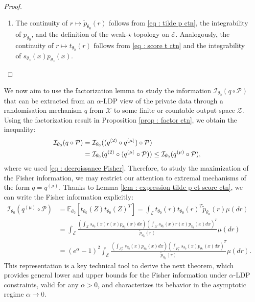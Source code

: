 \documentclass[a4paper, 11pt]{article}
\theoremstyle{definition}
\newcommand{\E}{{\mathbb{E}}}
\newcommand{\cE}{{\mathcal{E}}}
\newcommand{\cI}{{\mathcal{I}}}
\newcommand{\cJ}{{\mathcal{J}}}
\newcommand{\cP}{{\mathcal{P}}}
\newcommand{\cQ}{{\mathcal{Q}}}
\newcommand{\cX}{{\mathcal{X}}}
\newcommand{\cZ}{{\mathcal{Z}}}
\begin{document}
{\begin{proof}
\begin{enumerate}
\[	\]
    Recalling that $r(x)$ is as in \eqref{eq: def r(x)} and that $\int_{\mathcal{X}} s_{\theta_0}(x)p_{\theta_0}(x) dx = 0$ we deduce the second formula.
	\item The continuity of $r \mapsto \widetilde{p}_{\theta_0}(r)$ follows from \eqref{eq : tilde p ctn}, the integrability of $p_{\theta_0}$, and the definition of the weak-$\star$ topology on $\cE$. Analogously, the continuity of $r \mapsto t_{\theta_0}(r)$ follows from \eqref{eq : score t ctn} and the integrability of $s_{\theta_0}(x)p_{\theta_0}(x)$.
\end{enumerate}
\end{proof}
We now aim to use the factorization lemma to study the %
information $\cI_{\theta_0}(q\circ \cP)$ that can be extracted from an $\alpha$-LDP view of the private data through a randomisation mechanism $q$ from $\cX$ to some finite or countable output space $\cZ$.
Using the factorization result in Proposition \ref{prop : factor ctn}, we obtain the inequality:
\begin{align}{\label{eq: fact on Fisher cont}}
	\mathcal{I}_{\theta_0}(q \circ \mathcal{P}) 
	&= \mathcal{I}_{\theta_0}((q^{(2)} \circ q^{(\mu)}) \circ \mathcal{P}) \\
	&= \mathcal{I}_{\theta_0}(q^{(2)} \circ (q^{(\mu)} \circ \mathcal{P})) 
	\le \mathcal{I}_{\theta_0}(q^{(\mu)} \circ \mathcal{P}), \nonumber
\end{align}
where we used \eqref{eq : decroissance Fisher}.
Therefore, to study the maximization of the Fisher information, we may restrict our attention to extremal mechanisms of the form $q = q^{(\mu)}$. Thanks to Lemma \ref{lem : expression tilde p et score ctn}, we can write the Fisher information explicitly:
\begin{align}\nonumber
	\cI_{\theta_0}(q^{(\mu)}\circ \cP)
	&= \E_{\theta_0} \left[ t_{\theta_0}(Z) t_{\theta_0}(Z)^T \right] = \int_\cE t_{\theta_0}(r) t_{\theta_0}(r)^T \widetilde{p}_{\theta_0}(r) \mu(dr) \\
	&=\nonumber  \int_{\cE} 
	\frac{\left( \int_\cX s_{\theta_0}(x) r(x) p_{\theta_0}(x) dx \right)
	\left( \int_\cX s_{\theta_0}(x) r(x) p_{\theta_0}(x) dx \right)^T}
	{\widetilde{p}_{\theta_0}(r)} \mu(dr) \\
    & =\label{eq : Fisher ctn general_preli}(e^\alpha - 1)^2 \int_{\cE} 
	\frac{\left( \int_{F_r^+} s_{\theta_0}(x) p_{\theta_0}(x) dx \right)
	\left( \int_{F_r^+} s_{\theta_0}(x)p_{\theta_0}(x) dx \right)^T}
	{\widetilde{p}_{\theta_0}(r)} \mu(dr).
\end{align}
This representation is a key technical tool to derive the next theorem, which provides general lower and upper bounds for the Fisher information under $\alpha$-LDP constraints, valid for any $\alpha > 0$, and characterizes its behavior in the asymptotic regime $\alpha \rightarrow 0$.

}
\end{document}
